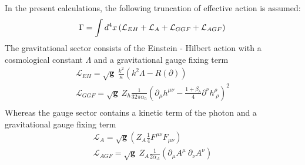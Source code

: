 \documentclass[11pt, a4paper]{article}
\begin{document}
In the present calculations, the following truncation of effective action is assumed:
\begin{equation}
    \Gamma = \int d^4 x \left( \mathcal{L}_{EH} + \mathcal{L}_A + \mathcal{L}_{GGF} + \mathcal{L}_{AGF} \right) \\
\end{equation}
The gravitational sector consists of the Einstein - Hilbert action with a cosmological constant $\Lambda$ and a gravitational gauge fixing term
\begin{gather}
    \mathcal{L}_{EH} = \sqrt{\mathbf{g}} \ \frac{k^2}{\kappa} \left( k^2 \Lambda - R(\partial)\right) \\
    \mathcal{L}_{GGF} = \sqrt{\mathbf{g}} \ Z_h \frac{1}{32 \pi \alpha_h} \left(\partial_\mu h^{\mu\nu} - \frac{1+\beta_h}{4} \partial^\nu h^\rho_{\; \rho} \right)^2\\
\end{gather}
Whereas the gauge sector contains a kinetic term of the photon
and a gravitational gauge fixing term
\begin{gather}
    \mathcal{L}_A =  \sqrt{\mathbf{g}} \left( Z_A \frac{1}{4} F^{\mu\nu} F_{\mu\nu} \right)\\%
    \mathcal{L}_{AGF} = \sqrt{\mathbf{g}} \ Z_A \frac{1}{2 \alpha_A} \left( \partial_\mu A^\mu \ \partial_\nu A^\nu \right) \\
\end{gather}

\end{document}
